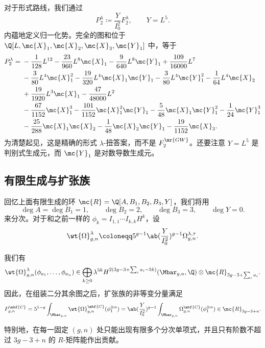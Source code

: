 对于形式路线，我们通过
\[ P_2^{\lambda} \coloneqq \frac{Y}{I_0^2}F_2^{\lambda}, \qquad Y = L^5. \]
内蕴地定义归一化势。完全的图和位于 \(\Q[L,\mc{X}_1,\mc{X}_2,\mc{X}_3,\mc{Y}_1]\) 中，等于
\begin{align*}
    P_2^{\lambda} ={}& -\frac{1}{128}L^{12} - \frac{23}{960}L^8\mc{X}_1 - \frac{9}{640}L^8\mc{Y}_1 + \frac{109}{16000}L^7 \\
    &- \frac{3}{80}L^4\mc{X}_1^2 - \frac{19}{320}L^4\mc{X}_1\mc{Y}_1 - \frac{3}{80}L^4\mc{Y}_1^2 - \frac{1}{64}L^4\mc{X}_2 \\
    &+ \frac{19}{1920}L^3\mc{X}_1 - \frac{47}{48000}L^2 \\
    &- \frac{67}{1152}\mc{X}_1^3 - \frac{101}{1152}\mc{X}_1^2\mc{Y}_1 - \frac{5}{48}\mc{X}_1\mc{Y}_1^2 - \frac{1}{24}\mc{Y}_1^3 \\
    &- \frac{25}{288}\mc{X}_1\mc{X}_2 - \frac{1}{48}\mc{X}_2\mc{Y}_1 - \frac{19}{1152}\mc{X}_3.
\end{align*}
为清楚起见，这是精确的形式 \(\lambda\)-扭答案，而不是 \(F_2^{\mr{GW}}\)。还要注意 \(Y = L^5\) 是判别式生成元，而 \(\mc{Y}_1\) 是对数导数生成元。

\subsection{有限生成与扩张族}%
\label{sub:Finite generation and the extended family}

回忆上面有限生成的环 \(\mc{R} = \Q[A,B_1,B_2,B_3,Y]\)，我们将用
\[ \deg A = \deg B_1 = 1, \qquad \deg B_2 = 2, \qquad \deg B_3 = 3, \qquad \deg Y = 0. \]
来分次。对于和之前一样的 \(\phi_k = I_{1,1}\cdots I_{k,k}H^k\)，设
\[ \wt{\Omega}^{\lambda}_{g,n} \coloneqq 5^{g-1}\ab(\frac{Y}{I_0^2})^{g-1}\Omega^{\lambda,\tau}_{g,n}. \]

\begin{thm}%
\label{thm:graded finite generation}
    我们有
    \[ \wt{\Omega}^{\lambda}_{g,n}(\phi_{a_1}, \ldots, \phi_{a_n}) \in \bigoplus_{k \geq 0}\lambda^{5k}H^{2(3g-3+\sum_i a_i - 5k)}(\Mbar_{g,n},\Q)\otimes \mc{R}_{3g-3+\sum_i a_i}. \]
    因此，在组装二分其余图之后，扩张族的非等变分量满足
    \[ P^{\mbf{C}}_{g,n} = 5^{1-g}\int_{\Mbar_{g,n}}\wt{\Omega}^{\mbf{C}}_{g,n}(\phi_1^{\otimes n}) = \ab( \frac{Y}{I_0^2})^{g-1}\int_{\Mbar_{g,n}}\Omega^{\mbf{C}}_{g,n}(\phi_1^{\otimes n}) \in \mc{R}_{3g-3+n}. \]
\end{thm}

特别地，在每一固定 \((g,n)\) 处只能出现有限多个分次单项式，并且只有阶数不超过 \(3g-3+n\) 的 \(R\)-矩阵能作出贡献。

